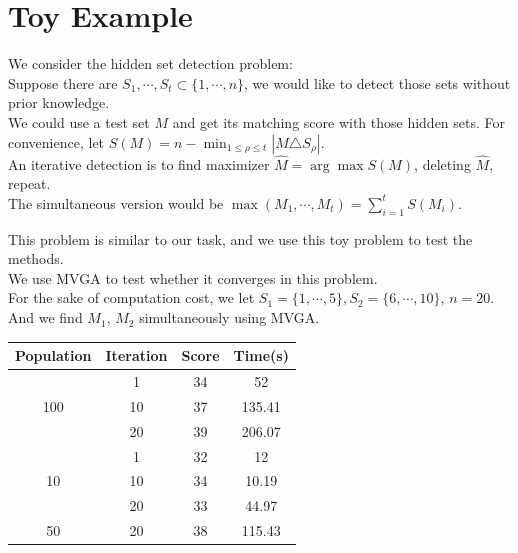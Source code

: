\documentclass[xcolor=dvipsnames]{beamer}
\begin{document}
\section{Toy Example}
\begin{frame}
We consider the hidden set detection problem:\\
Suppose there are $S_1,\cdots,S_t\subset \{1,\cdots,n\}$, we would like to detect those sets without prior knowledge.\\
We could use a test set $M$ and get its matching score with those hidden sets. For convenience, let $S(M)=n-\min_{1\leqslant\rho\leqslant t} |M\triangle S_{\rho}|$.\\
An iterative detection is to find maximizer $\hat{M}=\arg\max S(M)$, deleting $\hat{M}$, repeat.\\
The simultaneous version would be $\max(M_1,\cdots,M_t)=\sum_{i=1}^t S(M_i)$.\\
\end{frame}
\begin{frame}
This problem is similar to our task, and we use this toy problem to test the methods.\\
We use MVGA to test whether it converges in this problem.\\
For the sake of computation cost, we let $S_1=\{1,\cdots,5\}, S_2=\{6,\cdots,10\}$, $n=20$. And we find $M_1$, $M_2$ simultaneously using MVGA.\\
\begin{table}
\begin{tabular}{cccc}
\hline
Population&Iteration&Score&Time(s)\\
\hline
\multirow{3}{*}{100}&1&34&52\\
&10&37&135.41\\
&20&39&206.07\\
\multirow{3}{*}{10}&1&32&12\\
&10&34&10.19\\
&20&33&44.97\\
50&20&38&115.43\\
\end{tabular}
\end{table}
\end{frame}
\end{document}
